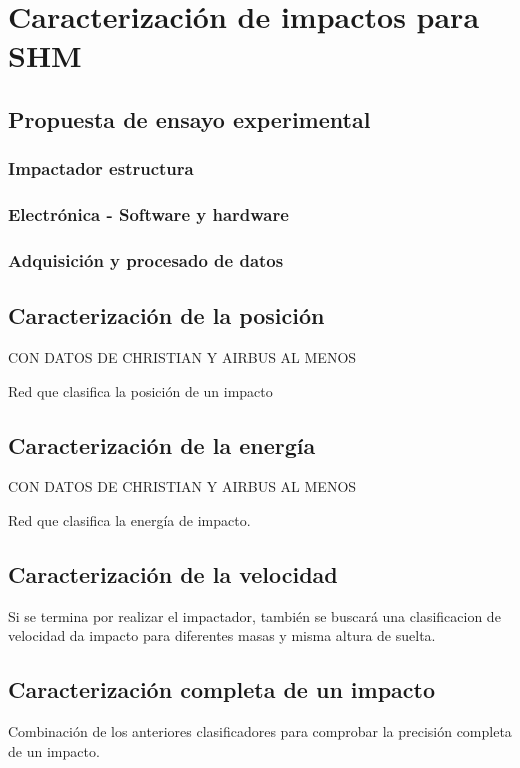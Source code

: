 \chapter{Caracterización de impactos para SHM}

\section{ Propuesta de ensayo experimental }

    \subsection{Impactador estructura}

    \subsection{Electrónica - Software y hardware}

    \subsection{Adquisición y procesado de datos}

\clearpage



\section{Caracterización de la posición}

CON DATOS DE CHRISTIAN Y AIRBUS AL MENOS

Red que clasifica la posición de un impacto

\clearpage



\section{Caracterización de la energía}

CON DATOS DE CHRISTIAN Y AIRBUS AL MENOS

Red que clasifica la energía de impacto.

\clearpage



\section{Caracterización de la velocidad}

Si se termina por realizar el impactador, también se buscará una clasificacion de velocidad da impacto para diferentes masas y misma altura de suelta.

\clearpage



\section{Caracterización completa de un impacto}

Combinación de los anteriores clasificadores para comprobar la precisión completa de un impacto.

\clearpage